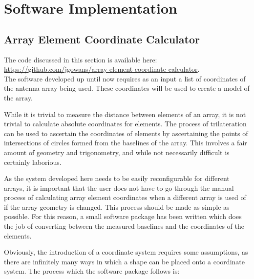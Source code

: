 \chapter{Software Implementation}
\section{Array Element Coordinate Calculator}

The code discussed in this section is available here:\\
\url{https://github.com/jgowans/array-element-coordinate-calculator}.\\

The software developed up until now requires as an input a list of coordinates of the antenna array being used.
These coordinates will be used to create a model of the array.

While it is trivial to measure the distance between elements of an array, it is not trivial to calculate absolute coordinates for elements. The process of trilateration can be used to ascertain the coordinates of elements by ascertaining the points of intersections of circles formed from the baselines of the array.
This involves a fair amount of geometry and trigonometry, and while not necessarily difficult is certainly laborious.

As the system developed here needs to be easily reconfigurable for different arrays, it is important that the user does not have to go through the manual process of calculating array element coordinates when a different array is used of if the array geometry is changed.
This process should be made as simple as possible.
For this reason, a small software package has been written which does the job of converting between the measured baselines and the coordinates of the elements.

Obviously, the introduction of a coordinate system requires some assumptions, as there are infinitely many ways in which a shape can be placed onto a coordinate system. The process which the software package follows is:

